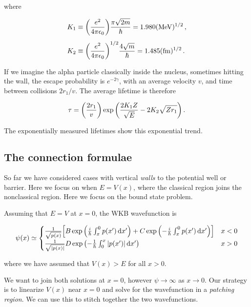 \documentclass[12pt, titlepage]{article}
\begin{document}
\begin{mdframed}[backgroundcolor=gray!20]
where

\begin{subequations}
\begin{align}
	K_1 &\equiv \qty(\frac{e^2}{4\pi\epsilon_0})\frac{\pi\sqrt{2m}}{\hbar} = 1.980(\si{\mega\electronvolt})^{1/2}\,, \\[4pt]
	K_2 &\equiv \qty(\frac{e^2}{4\pi\epsilon_0})^{1/2}\frac{4\sqrt{m}}{\hbar} = 1.485(\si{\femto\metre})^{1/2} \,.
\end{align}
\end{subequations}

If we imagine the alpha particle classically inside the nucleus, sometimes hitting the wall, the escape probability is $e^{-2\gamma}$, with an average velocity $v$, and time between collisions $2r_1/v$. The average lifetime is therefore

\begin{equation}
	\tau = \qty(\frac{2r_1}{v})\exp\qty(\frac{2K_1Z}{\sqrt{E}} - 2K_2\sqrt{Zr_1}) \,.
\end{equation} 

The exponentially measured lifetimes show this exponential trend.
\end{mdframed}

\subsection{The connection formulae}
So far we have considered cases with vertical \textit{walls} to the potential well or barrier. Here we focus on when $E = V(x)$, where the classical region joins the nonclassical region. Here we focus on the bound state problem. 

Assuming that $E = V$ at $x=0$, the WKB wavefunction is

\begin{equation}
	\psi(x) \simeq 
	\begin{cases}
	\frac{1}{\sqrt{p(x)}}\qty[B\exp\qty(\frac{i}{\hbar}\int_{x}^{0}p(x^\prime)\dd{x^\prime}) + C\exp\qty(-\frac{i}{\hbar}\int_{x}^{0}p(x^\prime)\dd{x^\prime})] & x<0 \\[4pt]
	\frac{1}{\sqrt{|p(x)|}} D \exp\qty(-\frac{1}{\hbar}\int_{0}^{x}|p(x^\prime)|\dd{x^\prime}) & x>0
	\end{cases}
\end{equation}


where we have assumed that $V(x)>E$ for all $x>0$. 

We want to join both solutions at $x=0$, however $\psi\rightarrow\infty$ as $x\rightarrow 0$. Our strategy is to linearize $V(x)$ near $x=0$ and solve for the wavefunction in a \textit{patching region}. We can use this to stitch together the two wavefunctions.
\end{document}
